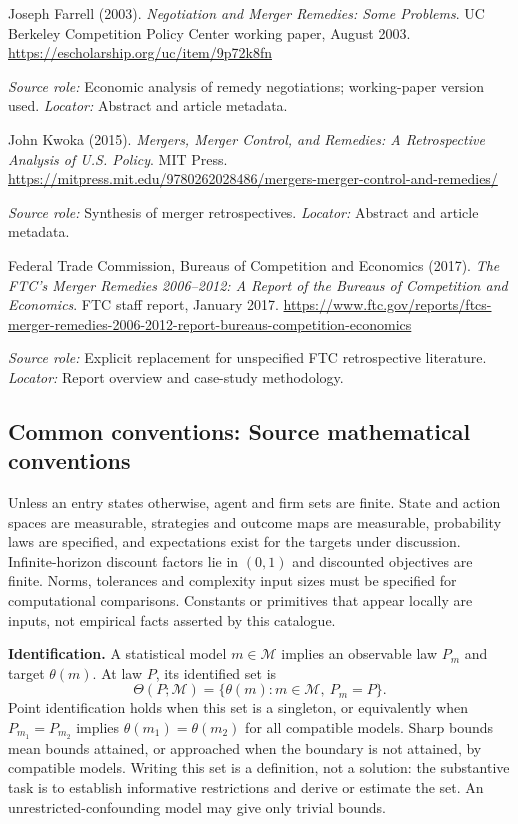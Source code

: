 \documentclass[11pt,a4paper]{article}
\begin{document}
\begin{enumerate}[label={[S\arabic*]},leftmargin=*]

\item Joseph Farrell (2003). \emph{Negotiation and Merger Remedies: Some Problems}. UC Berkeley Competition Policy Center working paper, August 2003. \url{https://escholarship.org/uc/item/9p72k8fn}\par \textit{Source role:} Economic analysis of remedy negotiations; working-paper version used. \textit{Locator:} Abstract and article metadata.

\item John Kwoka (2015). \emph{Mergers, Merger Control, and Remedies: A Retrospective Analysis of U.S. Policy}. MIT Press. \url{https://mitpress.mit.edu/9780262028486/mergers-merger-control-and-remedies/}\par \textit{Source role:} Synthesis of merger retrospectives. \textit{Locator:} Abstract and article metadata.

\item Federal Trade Commission, Bureaus of Competition and Economics (2017). \emph{The FTC's Merger Remedies 2006--2012: A Report of the Bureaus of Competition and Economics}. FTC staff report, January 2017. \url{https://www.ftc.gov/reports/ftcs-merger-remedies-2006-2012-report-bureaus-competition-economics}\par \textit{Source role:} Explicit replacement for unspecified FTC retrospective literature. \textit{Locator:} Report overview and case-study methodology.

\end{enumerate}

\subsection*{Common conventions: Source mathematical conventions}

Unless an entry states otherwise, agent and firm sets are finite. State and action spaces are measurable, strategies and outcome maps are measurable, probability laws are specified, and expectations exist for the targets under discussion. Infinite-horizon discount factors lie in $(0,1)$ and discounted objectives are finite. Norms, tolerances and complexity input sizes must be specified for computational comparisons. Constants or primitives that appear locally are inputs, not empirical facts asserted by this catalogue.

\textbf{Identification.} A statistical model $m\in\mathcal M$ implies an observable law $P_m$ and target $\theta(m)$. At law $P$, its identified set is
\[
\Theta(P;\mathcal M)=\{\theta(m):m\in\mathcal M,\ P_m=P\}.
\]
Point identification holds when this set is a singleton, or equivalently when $P_{m_1}=P_{m_2}$ implies $\theta(m_1)=\theta(m_2)$ for all compatible models. Sharp bounds mean bounds attained, or approached when the boundary is not attained, by compatible models. Writing this set is a definition, not a solution: the substantive task is to establish informative restrictions and derive or estimate the set. An unrestricted-confounding model may give only trivial bounds.
\end{document}
